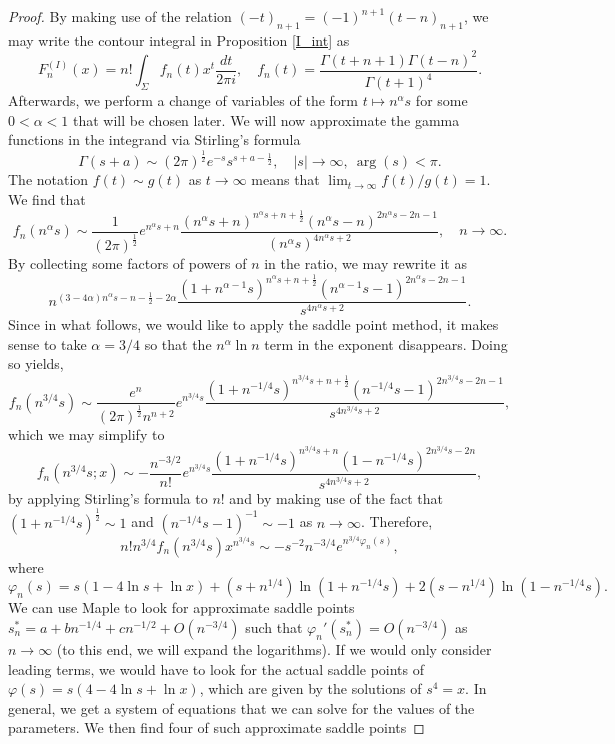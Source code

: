 \documentclass[10pt,a4paper]{amsart}
\newcommand{\p}{\varphi}
\begin{document}
\begin{proof}
By making use of the relation $(-t)_{n+1} = (-1)^{n+1} (t-n)_{n+1}$, we may write the contour integral in Proposition \ref{I_int} as 
    $$F_n^{(I)}(x) = n! \int_{\Sigma} f_n(t) x^t \frac{dt}{2\pi i},\quad f_n(t) = \frac{\Gamma(t+n+1)\Gamma(t-n)^2}{\Gamma(t+1)^4}.$$
Afterwards, we perform a change of variables of the form $t\mapsto n^{\alpha} s$ for some $0<\alpha<1$ that will be chosen later. We will now approximate the gamma functions in the integrand via Stirling's formula
    $$\Gamma(s+a) \sim (2\pi)^{\frac{1}{2}} e^{-s} s^{s+a-\frac{1}{2}},\quad |s|\to\infty,\ \arg(s) < \pi. $$
The notation $f(t)\sim g(t)$ as $t\to\infty$ means that $\lim_{t\to\infty }f(t)/g(t) = 1$. We find that
$$f_n(n^{\alpha}s) \sim \frac{1}{(2\pi)^{\frac{1}{2}}} e^{n^{\alpha}s+n} \frac{(n^{\alpha}s+n)^{n^{\alpha}s+n+\frac{1}{2}} (n^{\alpha}s-n)^{2n^{\alpha}s-2n-1}}{(n^{\alpha}s)^{4n^{\alpha}s+2}},\quad n\to\infty. $$
By collecting some factors of powers of $n$ in the ratio, we may rewrite it as 
$$ n^{(3-4\alpha)n^{\alpha}s - n - \frac{1}{2} -2\alpha} \frac{(1+n^{\alpha-1}s)^{n^{\alpha}s+n+\frac{1}{2}} (n^{\alpha-1}s-1)^{2n^{\alpha}s-2n-1}}{s^{4n^{\alpha}s+2}}. $$
Since in what follows, we would like to apply the saddle point method, it makes sense to take $\alpha=3/4$ so that the $n^\alpha \ln n$ term in the exponent disappears. Doing so yields,
$$f_n(n^{3/4}s) \sim \frac{e^{n}}{(2\pi)^{\frac{1}{2}} n^{n+2}} e^{n^{3/4}s} \frac{(1+n^{-1/4}s)^{n^{3/4}s+n+\frac{1}{2}} (n^{-1/4}s-1)^{2n^{3/4}s-2n-1}}{s^{4n^{3/4}s+2}}, $$
which we may simplify to
$$f_n(n^{3/4}s;x) \sim - \frac{n^{-3/2}}{n!} e^{n^{3/4}s} \frac{(1+n^{-1/4}s)^{n^{3/4}s+n} (1-n^{-1/4}s)^{2n^{3/4}s-2n}}{s^{4n^{3/4}s+2}}, $$
by applying Stirling's formula to $n!$ and by making use of the fact that $(1+n^{-1/4}s)^{\frac{1}{2}}\sim 1$ and $(n^{-1/4}s-1)^{-1}\sim -1$ as $n\to\infty$. Therefore,
$$ n! n^{3/4} f_n(n^{3/4}s) x^{n^{3/4}s} \sim - s^{-2} n^{-3/4} e^{n^{3/4}\p_n(s)},  $$
where
    $$\p_n(s) = s(1-4\ln s+\ln x) + (s+n^{1/4})\ln(1+n^{-1/4}s) + 2 (s-n^{1/4}) \ln(1-n^{-1/4}s).$$  
We can use Maple to look for approximate saddle points $s^\ast_n = a+bn^{-1/4}+cn^{-1/2}+O(n^{-3/4})$ such that $\p_n'(s^\ast_n)=O(n^{-3/4})$ as $n\to\infty$ (to this end, we will expand the logarithms). If we would only consider leading terms, we would have to look for the actual saddle points of $\p(s)=s(4-4\ln s+\ln x)$, which are given by the solutions of $s^4=x$. In general, we get a system of equations that we can solve for the values of the parameters. We then find four of such approximate saddle points

\end{proof}
\end{document}
